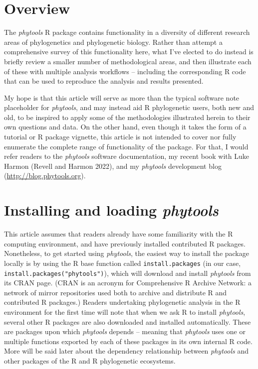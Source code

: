 \documentclass[fleqn,10pt,lineno]{wlpeerj} %
\begin{document}
\hypertarget{overview}{%
\section{Overview}\label{overview}}

The \emph{phytools} R package contains functionality in a diversity of different research areas of phylogenetics and phylogenetic biology. Rather than attempt a comprehensive survey of this functionality here, what I've elected to do instead is briefly review a smaller number of methodological areas, and then illustrate each of these with multiple analysis workflows -- including the corresponding R code that can be used to reproduce the analysis and results presented.

My hope is that this article will serve as more than the typical software note placeholder for \emph{phytools}, and may instead aid R phylogenetic users, both new and old, to be inspired to apply some of the methodologies illustrated herein to their own questions and data. On the other hand, even though it takes the form of a tutorial or R package vignette, this article is not intended to cover nor fully enumerate the complete range of functionality of the package. For that, I would refer readers to the \emph{phytools} software documentation, my recent book with Luke Harmon (Revell and Harmon 2022), and my \emph{phytools} development blog (\url{http://blog.phytools.org}).

\hypertarget{installing-and-loading-phytools}{%
\section{\texorpdfstring{Installing and loading \emph{phytools}}{Installing and loading phytools}}\label{installing-and-loading-phytools}}

This article assumes that readers already have some familiarity with the R computing environment, and have previously installed contributed R packages. Nonetheless, to get started using \emph{phytools}, the easiest way to install the package locally is by using the R base function called \texttt{install.packages} (in our case, \texttt{install.packages("phytools")}), which will download and install \emph{phytools} from its CRAN page. (CRAN is an acronym for Comprehensive R Archive Network: a network of mirror repositories used both to archive and distribute R and contributed R packages.) Readers undertaking phylogenetic analysis in the R environment for the first time will note that when we ask R to install \emph{phytools}, several other R packages are also downloaded and installed automatically. These are packages upon which \emph{phytools} depends -- meaning that \emph{phytools} uses one or multiple functions exported by each of these packages in its own internal R code. More will be said later about the dependency relationship between \emph{phytools} and other packages of the R and R phylogenetic ecosystems.
\end{document}
